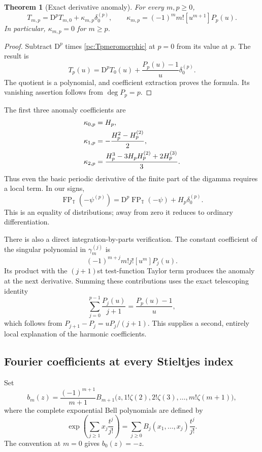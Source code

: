 \documentclass[11pt,a4paper]{article}
\numberwithin{equation}{section}
\newtheorem{theorem}{Theorem}[section]
\theoremstyle{definition}
\newcommand{\T}{\mathbb T}
\newcommand{\D}{\mathrm D}
\newcommand{\FP}{\operatorname{FP}}
\begin{document}
\begin{theorem}[Exact derivative anomaly]\label{pc:derivative}
For every $m,p\ge0$,
\begin{equation}\label{pc:derivativeformula}
 T_{m,p}=\D^pT_{m,0}+\kappa_{m,p}\delta_0^{(p)},\qquad
 \kappa_{m,p}=(-1)^m m![u^{m+1}]P_p(u).
\end{equation}
In particular, $\kappa_{m,p}=0$ for $m\ge p$.
\end{theorem}
\begin{proof}
Subtract $\D^p$ times \eqref{pc:Tpmeromorphic} at $p=0$ from its value at $p$. The result is
\begin{equation}\label{pc:derivativegenerator}
 T_p(u)=\D^pT_0(u)+\frac{P_p(u)-1}{u}\delta_0^{(p)}.
\end{equation}
The quotient is a polynomial, and coefficient extraction proves the formula. Its vanishing assertion follows from $\deg P_p=p$.
\end{proof}
The first three anomaly coefficients are
\begin{align}
 \kappa_{0,p}&=H_p,\label{pc:kappatable}\\
 \kappa_{1,p}&=-\frac{H_p^2-H_p^{(2)}}2,\notag\\
 \kappa_{2,p}&=\frac{H_p^3-3H_pH_p^{(2)}+2H_p^{(3)}}3.\notag
\end{align}
Thus even the basic periodic derivative of the finite part of the digamma requires a local term. In our signs,
\[
 \FP_{\T}(-\psi^{(p)})=\D^p\FP_{\T}(-\psi)+H_p\delta_0^{(p)}.
\]
This is an equality of distributions; away from zero it reduces to ordinary differentiation.

There is also a direct integration-by-parts verification. The constant coefficient of the singular polynomial in $\gamma_m^{(j)}$ is
\[
 (-1)^{m+j}m!j![u^m]P_j(u).
\]
Its product with the $(j+1)$st test-function Taylor term produces the anomaly at the next derivative. Summing these contributions uses the exact telescoping identity
\begin{equation}\label{pc:telescope}
 \sum_{j=0}^{p-1}\frac{P_j(u)}{j+1}=\frac{P_p(u)-1}{u},
\end{equation}
which follows from $P_{j+1}-P_j=uP_j/(j+1)$. This supplies a second, entirely local explanation of the harmonic coefficients.

\subsection{Fourier coefficients at every Stieltjes index}
Set
\begin{equation}\label{pc:bell}
 b_m(z)=\frac{(-1)^{m+1}}{m+1}
 B_{m+1}\bigl(z,1!\zeta(2),2!\zeta(3),\ldots,m!\zeta(m+1)\bigr),
\end{equation}
where the complete exponential Bell polynomials are defined by
\[
 \exp\left(\sum_{j\ge1}x_j\frac{t^j}{j!}\right)
 =\sum_{j\ge0}B_j(x_1,\ldots,x_j)\frac{t^j}{j!}.
\]
The convention at $m=0$ gives $b_0(z)=-z$.
\end{document}
